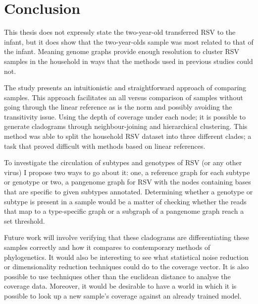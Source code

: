 \documentclass[10pt, a4paper]{article}
\begin{document}
\newpage
\section{Conclusion}
\label{sec:org36e9ff8}
This thesis does not expressly state the two-year-old transferred RSV to the
infant, but it does show that the two-year-olds sample was most related to that
of the infant.
Meaning genome graphs provide enough resolution to cluster RSV samples in the
household in ways that the methods used in previous studies could not. 

The study presents an intuitionistic and straightforward approach of comparing
samples.
This approach facilitates an all versus comparison of samples without going
through the linear reference as is the norm and possibly avoiding the
transitivity issue.
Using the depth of coverage under each node; it is possible to generate
cladograms through neighbour-joining and hierarchical clustering.
This method was able to split the household RSV dataset into three different
clades; a task that proved difficult with methods based on linear references.

To investigate the circulation of subtypes and genotypes of RSV
(or any other virus) I propose two ways to go about it: one, a reference graph
for each subtype or genotype or two, a pangenome graph for RSV with the nodes
containing bases that are specific to given subtypes annotated.
Determining whether a genotype or subtype is present in a sample would be a
matter of checking whether the reads that map to a type-specific graph or a
subgraph of a pangenome graph reach a set threshold.

Future work will involve verifying that these cladograms are differentiating
these samples correctly and how it compares to contemporary methods of
phylogenetics.
It would also be interesting to see what statistical noise reduction or
dimensionality reduction techniques could do to the coverage vector.
It is also possible to use techniques other than the euclidean distance to
analyse the coverage data. Moreover, it would be desirable to have a world in
which it is possible to look up a new sample's coverage against an already
trained model.

\newpage


\end{document}
